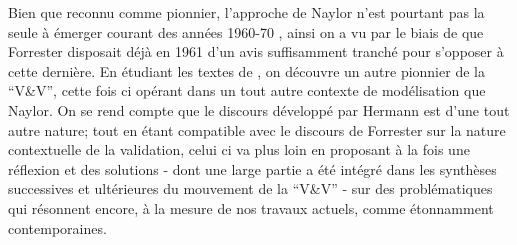 Bien que reconnu comme pionnier, l'approche de Naylor n'est pourtant pas la seule à émerger courant des années 1960-70 \autocite{Balci1980}, ainsi on a vu par le biais de \autocite{Barlas1990} que Forrester disposait déjà en 1961 d'un avis suffisamment tranché pour s'opposer à cette dernière. En étudiant les textes de \textcite{Hermann1967}, on découvre un autre pionnier de la \enquote{V\&V}, cette fois ci opérant dans un tout autre contexte de modélisation que Naylor. On se rend compte que le discours développé par Hermann est d'une tout autre nature; tout en étant compatible avec le discours de Forrester sur la nature contextuelle de la validation, celui ci va plus loin en proposant à la fois une réflexion et des solutions - dont une large partie a été intégré dans les synthèses successives et ultérieures du mouvement de la \enquote{V\&V} - sur des problématiques qui résonnent encore, à la mesure de nos travaux actuels, comme étonnamment contemporaines.
